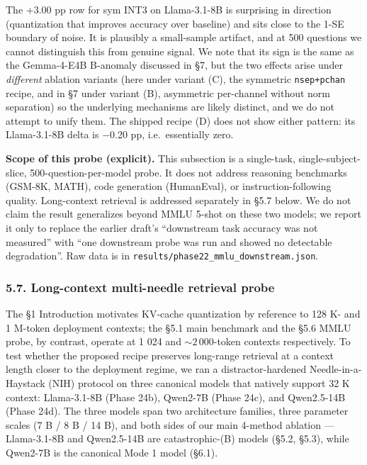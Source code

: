 The +3.00 pp row for sym INT3 on Llama-3.1-8B is surprising in direction
(quantization that improves accuracy over baseline) and sits close to
the 1-SE boundary of noise. It is plausibly a small-sample artifact, and
at 500 questions we cannot distinguish this from genuine signal. We note
that its sign is the same as the Gemma-4-E4B B-anomaly discussed in §7,
but the two effects arise under \emph{different} ablation variants (here
under variant (C), the symmetric \texttt{nsep+pchan} recipe, and in §7
under variant (B), asymmetric per-channel without norm separation) so
the underlying mechanisms are likely distinct, and we do not attempt to
unify them. The shipped recipe (D) does not show either pattern: its
Llama-3.1-8B delta is −0.20 pp, i.e.~essentially zero.

\textbf{Scope of this probe (explicit).} This subsection is a
single-task, single-subject-slice, 500-question-per-model probe. It does
not address reasoning benchmarks (GSM-8K, MATH), code generation
(HumanEval), or instruction-following quality. Long-context retrieval is
addressed separately in §5.7 below. We do not claim the result
generalizes beyond MMLU 5-shot on these two models; we report it only to
replace the earlier draft's ``downstream task accuracy was not
measured'' with ``one downstream probe was run and showed no detectable
degradation''. Raw data is in
\texttt{results/phase22\_mmlu\_downstream.json}.

\subsubsection{5.7. Long-context multi-needle retrieval
probe}\label{long-context-multi-needle-retrieval-probe}

The §1 Introduction motivates KV-cache quantization by reference to 128
K- and 1 M-token deployment contexts; the §5.1 main benchmark and the
§5.6 MMLU probe, by contrast, operate at 1 024 and \(\sim 2\,000\)-token
contexts respectively. To test whether the proposed recipe preserves
long-range retrieval at a context length closer to the deployment
regime, we ran a distractor-hardened Needle-in-a-Haystack (NIH) protocol
on three canonical models that natively support 32 K context:
Llama-3.1-8B (Phase 24b), Qwen2-7B (Phase 24c), and Qwen2.5-14B (Phase
24d). The three models span two architecture families, three parameter
scales (7 B / 8 B / 14 B), and both sides of our main 4-method ablation
--- Llama-3.1-8B and Qwen2.5-14B are catastrophic-(B) models (§5.2,
§5.3), while Qwen2-7B is the canonical Mode 1 model (§6.1).

